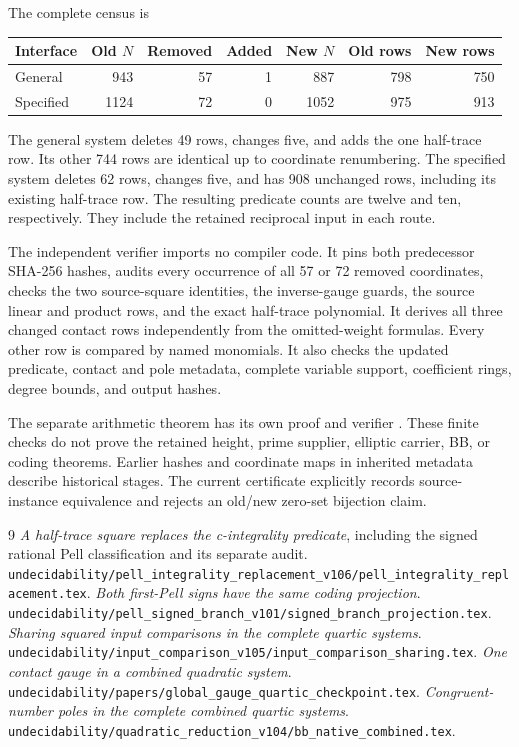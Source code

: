 \documentclass[11pt]{article}
\begin{document}
The complete census is
\begin{center}
\begin{tabular}{@{}lrrrrrr@{}}
\toprule
Interface & Old $N$ & Removed & Added & New $N$ & Old rows & New rows\\
\midrule
General &943&57&1&887&798&750\\
Specified &1124&72&0&1052&975&913\\
\bottomrule
\end{tabular}
\end{center}
The general system deletes 49 rows, changes five, and adds the
one half-trace row. Its other 744 rows are identical up to
coordinate renumbering. The specified system deletes 62 rows,
changes five, and has 908 unchanged rows, including its existing
half-trace row. The resulting predicate counts are twelve and
ten, respectively. They include the retained reciprocal input
in each route.

The independent verifier imports no compiler code. It pins both
predecessor SHA-256 hashes, audits every occurrence of all 57 or
72 removed coordinates, checks the two source-square identities,
the inverse-gauge guards, the source linear and product rows,
and the exact half-trace polynomial. It derives all three changed
contact rows independently from the omitted-weight formulas.
Every other row is compared by named monomials. It also checks
the updated predicate, contact and pole metadata, complete variable
support, coefficient rings, degree bounds, and output hashes.

The separate arithmetic theorem has its own proof and verifier
\cite{replacement}. These finite checks do not prove the retained
height, prime supplier, elliptic carrier, BB, or coding theorems.
Earlier hashes and coordinate maps in inherited metadata describe
historical stages. The current certificate explicitly records
source-instance equivalence and rejects an old/new zero-set
bijection claim.

\begin{thebibliography}{9}
 \emph{A half-trace square replaces the
c-integrality predicate}, including the signed rational Pell
classification and its separate audit.
\nolinkurl{undecidability/pell_integrality_replacement_v106/pell_integrality_replacement.tex}.
 \emph{Both first-Pell signs have the same coding
projection}.
\nolinkurl{undecidability/pell_signed_branch_v101/signed_branch_projection.tex}.
 \emph{Sharing squared input comparisons in the
complete quartic systems}.
\nolinkurl{undecidability/input_comparison_v105/input_comparison_sharing.tex}.
 \emph{One contact gauge in a combined quadratic system}.
\nolinkurl{undecidability/papers/global_gauge_quartic_checkpoint.tex}.
 \emph{Congruent-number poles in the complete combined
quartic systems}.
\nolinkurl{undecidability/quadratic_reduction_v104/bb_native_combined.tex}.
\end{thebibliography}
\end{document}

